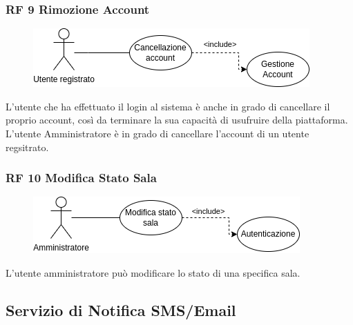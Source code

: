 \documentclass{article}
\begin{document}
\subsubsection{RF 9 Rimozione Account}\label{rf_9}
\begin{description}
	
	\begin{figure}[htp]
		\centering
		\includegraphics[]{rf9.png}
	\end{figure}
	
	\item L'utente che ha effettuato il login al sistema è anche in grado di cancellare il proprio account, così da terminare la sua capacità di usufruire della piattaforma. L'utente Amministratore è in grado di cancellare l'account di un utente regsitrato.
\end{description}

\subsubsection{RF 10 Modifica Stato Sala}\label{rf_10}
\begin{description}
	
	\begin{figure}[htp]
		\centering
		\includegraphics[]{rf10.png}
	\end{figure}
	
	\item L'utente amministratore può modificare lo stato di una specifica sala.
\end{description}

\clearpage

\subsection{Servizio di Notifica SMS/Email}
\end{document}
